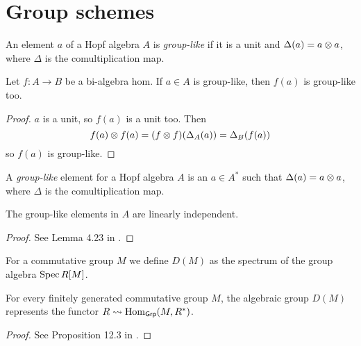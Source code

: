 \section{Group schemes}


\begin{definition}
  \label{0-grp-like}
  \uses{}
  \leanok

  An element $a$ of a Hopf algebra $A$ is \emph{group-like} if it is a unit and $\Delta(a) = a \otimes a$, where $\Delta$ is the comultiplication map.
\end{definition}


\begin{lemma}
  \label{0-grp-like-map}
  \leanok

  Let $f : A \to B$ be a bi-algebra hom. If $a \in A$ is group-like, then $f(a)$ is group-like too.
\end{lemma}
\begin{proof}
  \uses{}
  \leanok

  $a$ is a unit, so $f(a)$ is a unit too. Then
  \[
    f(a) \otimes f(a) = (f \otimes f)(\Delta_A(a)) = \Delta_B(f(a))
  \]
  so $f(a)$ is group-like.
\end{proof}


\begin{definition}
  \label{0-grp-like}
  \uses{}
  \leanok

  A \emph{group-like} element for a Hopf algebra $A$ is an $a\in A^*$ such that $\Delta(a) = a \otimes a$, where $\Delta$ is the comultiplication map.
\end{definition}


\begin{lemma}
  \label{0-grp-like_li}
  The group-like elements in $A$ are linearly independent.
\end{lemma}
\begin{proof}
  See Lemma 4.23 in \cite{Milne_2017}.
\end{proof}

\begin{definition}
  \label{grp_alg_sch}
  For a commutative group $M$ we define $D(M)$ as the spectrum of the group algebra $\operatorname{Spec} R[M]$.
\end{definition}

\begin{proposition}
  \label{DM_func}
  For every finitely generated commutative group $M$, the algebraic group $D(M)$
  represents the functor $R \rightsquigarrow \operatorname{Hom}_{\mathsf{Grp}}(M,R^*)$.
\end{proposition}
\begin{proof}
  See Proposition 12.3 in \cite{Milne_2017}.
\end{proof}

